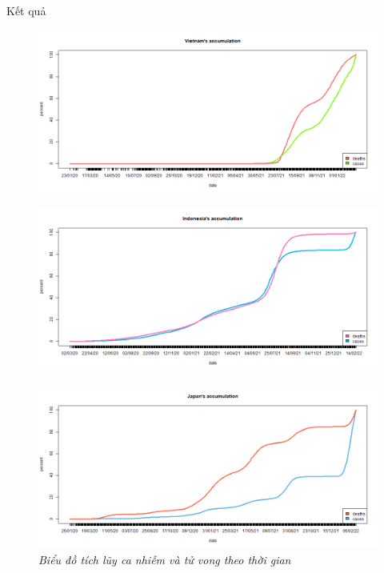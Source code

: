 \documentclass[a4paper]{article}
\theoremstyle{definition}
\begin{document}
\begin{enumerate}[1)]
Kết quả

    \begin{figure}[H]
        \begin{center}
        \includegraphics[scale = 0.4]{ix/ix.1/Vietnam's accumulation.png}
        \end{center}
    \end{figure}
    
    \begin{figure}[H]
        \begin{center}
        \includegraphics[scale = 0.4]{ix/ix.1/Indonesia's accumulation.png}
        \end{center}
    \end{figure}
    
    \begin{figure}[H]
        \begin{center}
        \includegraphics[scale = 0.4]{ix/ix.1/Japan's accumulation.png}
        \end{center}
        \vspace{+3mm}\caption{\it Biểu đồ tích lũy ca nhiễm và tử vong theo thời gian}
    \end{figure}


\end{enumerate}
\end{document}
